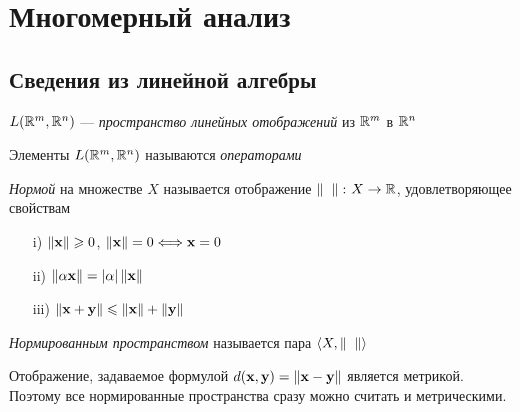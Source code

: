 \newcommand{\x}{\ex}
\newcommand{\y}{\ey}
\newcommand{\h}{\eh}
\newcommand{\w}{\ew}
\newcommand{\z}{\ez}
\newcommand{\Od}{\cO}
\newcommand{\N}{\bN}
\renewcommand{\C}{\bC}

\chapter{Многомерный анализ}

\section{Сведения из линейной алгебры}

\begin{definition}
    $L(\mathbb{R}^m, \mathbb{R}^n)$ --- \textit{пространство линейных отображений} из $\mathbb{R}^m$ в $\mathbb{R}^n$
\end{definition}

\begin{definition}
    Элементы $L(\mathbb{R}^m, \mathbb{R}^n)$ называются \textit{операторами}
\end{definition}

\begin{definition}
    \textit{Нормой} на множестве $X$ называется отображение
     $\left\lVert\phantom{x}\right\rVert \colon X \to \mathbb{R}$, удовлетворяющее свойствам
     \begin{itemize}
         \item[i)] $\norm{\x} \geqslant 0$, $\norm{\x} = 0 \Llra \x = 0$
         \item[ii)] $\norm{\a\x} = |\a|\norm{\x}$
         \item[iii)] $\norm{\x + \y} \leqslant \norm{\x} + \norm{\y}$
     \end{itemize}
\end{definition}

\begin{definition}
    \textit{Нормированным пространством} называется пара $\langle X,
    \left\lVert\phantom{x}\right\rVert \rangle$
\end{definition}

\begin{remark}
    Отображение, задаваемое формулой $d(\x, \y) = \norm{\x - \y}$ является
    метрикой. Поэтому все нормированные пространства сразу можно считать
    и метрическими.
\end{remark}

